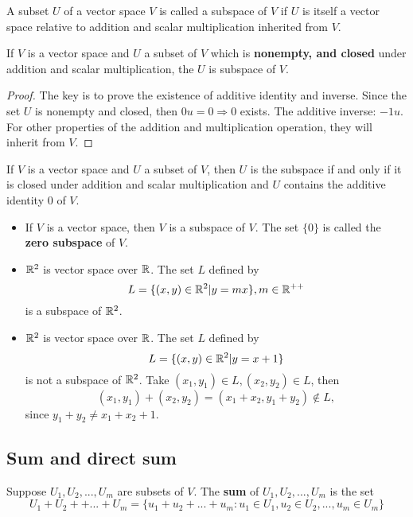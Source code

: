 \begin{refsection}
\begin{definition}[subspace]
\cite[64]{Howlett2001@vector}A subset $U$ of a vector space $V$ is called a subspace of $V$ if $U$ is itself a vector space relative to addition and scalar multiplication inherited from $V$.
\end{definition}

\begin{theorem}[subspace]
If $V$ is a vector space and $U$ a subset of $V$ which is \textbf{nonempty, and closed} under addition and scalar multiplication, the $U$ is subspace of $V$.
\end{theorem}
\begin{proof}
The key is to prove the existence of additive identity and inverse. Since the set $U$ is nonempty and closed, then $0 u = 0 \Rightarrow 0$ exists. The additive inverse: $-1 u$. For other properties of the addition and multiplication operation, they will inherit from $V$.
\end{proof}


\begin{theorem}
\cite[18]{axler2015linear}
If $V$ is a vector space and $U$ a subset of $V$, then $U$ is the subspace if and only if it is closed under addition and scalar multiplication and $U$ contains the additive identity $0$ of $V$.
\end{theorem}

\begin{example}\hfill
\begin{itemize}
	\item If $V$ is a vector space, then $V$ is a subspace of $V$. The set $\{0\}$ is called the \textbf{zero subspace} of $V$.
	\item $\mathbb{R}^2$ is vector space over $\mathbb{R}$. The set $L$ defined by
	$$L = \{(x,y)\in\mathbb{R}^2|y = mx\},m\in \mathbb{R}^{++}$$
	is a subspace of $\mathbb{R}^2$.
	\item $\mathbb{R}^2$ is vector space over $\mathbb{R}$. The set $L$ defined by
	$$L = \{(x,y)\in\mathbb{R}^2|y = x + 1\}$$
	is not a subspace of $\mathbb{R}^2$. Take $(x_1,y_1)\in L, (x_2,y_2)\in L$, then
	$$(x_1,y_1)+ (x_2,y_2) = (x_1+x_2,y_1+y_2) \notin L,$$
	since $y_1+y_2\neq x_1+x_2+1$.
\end{itemize}	
\end{example}


\subsection{Sum and direct sum}\label{ch:linearalgebra:sec:vectorspace:subsec:sumdirectsum}
\begin{definition}
\cite[20]{axler2015linear} Suppose $U_1,U_2,...,U_m$ are subsets of $V$. The \textbf{sum} of $U_1,U_2,...,U_m$ is the set
$$U_1+U_2++...+U_m = \{u_1+u_2+...+u_m:u_1\in U_1,u_2 \in U_2,...,u_m\in U_m\}$$
\end{definition}


\end{refsection}
